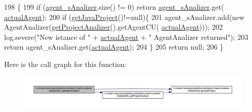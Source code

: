 \begin{DoxyCode}
198                                                    \{
199         \textcolor{keywordflow}{if} (\hyperlink{classit_1_1isislab_1_1masonassisteddocumentation_1_1mason_1_1analizer_1_1_global_utility_aad25923935f25b348200a005914af973}{agent\_sAnalizer}.size() != 0) \textcolor{keywordflow}{return} \hyperlink{classit_1_1isislab_1_1masonassisteddocumentation_1_1mason_1_1analizer_1_1_global_utility_aad25923935f25b348200a005914af973}{agent\_sAnalizer}.get(
      \hyperlink{classit_1_1isislab_1_1masonassisteddocumentation_1_1mason_1_1analizer_1_1_global_utility_ad969120645ce5135ca95177f6bb5ce42}{actualAgent});
200         \textcolor{keywordflow}{if} (\hyperlink{classit_1_1isislab_1_1masonassisteddocumentation_1_1mason_1_1analizer_1_1_global_utility_ab1fa2a5ac258d0119ca7d486261c01fb}{getJavaProject}()!=null)\{
201             agent\_sAnalizer.add(\textcolor{keyword}{new} AgentAnalizer(\hyperlink{classit_1_1isislab_1_1masonassisteddocumentation_1_1mason_1_1analizer_1_1_global_utility_a78cbdc6022c558d1375a01095ad95659}{getProjectAnalizer}().getAgentCU(
      \hyperlink{classit_1_1isislab_1_1masonassisteddocumentation_1_1mason_1_1analizer_1_1_global_utility_ad969120645ce5135ca95177f6bb5ce42}{actualAgent})));
202             log.severe(\textcolor{stringliteral}{"New istance of "} + \hyperlink{classit_1_1isislab_1_1masonassisteddocumentation_1_1mason_1_1analizer_1_1_global_utility_ad969120645ce5135ca95177f6bb5ce42}{actualAgent} + \textcolor{stringliteral}{" AgentAnalizer returned"});
203             \textcolor{keywordflow}{return} agent\_sAnalizer.get(\hyperlink{classit_1_1isislab_1_1masonassisteddocumentation_1_1mason_1_1analizer_1_1_global_utility_ad969120645ce5135ca95177f6bb5ce42}{actualAgent});
204         \}
205         \textcolor{keywordflow}{return} null;
206     \}
\end{DoxyCode}


Here is the call graph for this function\-:
\nopagebreak
\begin{figure}[H]
\begin{center}
\leavevmode
\includegraphics[width=350pt]{classit_1_1isislab_1_1masonassisteddocumentation_1_1mason_1_1analizer_1_1_global_utility_adf157ad87f33184753c407314fd34121_cgraph}
\end{center}
\end{figure}




